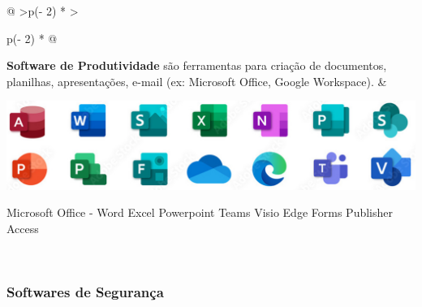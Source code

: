 \documentclass[
]{book}
\begin{document}
\begin{longtable}[]{@{}
  >{\centering\arraybackslash}p{(\columnwidth - 2\tabcolsep) * }
  >{\raggedright\arraybackslash}p{(\columnwidth - 2\tabcolsep) * }@{}}
\toprule\noalign{}
\endhead
\bottomrule\noalign{}
\endlastfoot
\textbf{Software de Produtividade} são ferramentas para criação de documentos, planilhas, apresentações, e-mail (ex: Microsoft Office, Google Workspace). & \begin{minipage}[t]{\linewidth}\raggedright
\begin{center}
\includegraphics{images/InfraEstrutura/software/MS-Office.jpg}

Microsoft Office - Word Excel Powerpoint Teams Visio Edge Forms Publisher Access
\end{center}
\end{minipage} \\
\end{longtable}

\subsubsection{Softwares de Segurança}\label{softwares-de-seguranuxe7a}
\end{document}

